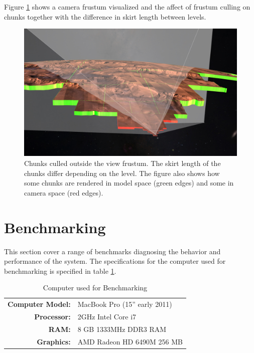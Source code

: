 Figure \ref{fig:frustummars} shows a camera frustum visualized and the affect of frustum culling on chunks together with the difference in skirt length between levels.

\begin{figure}[h]
    \centering
        \includegraphics[width=\textwidth]{figures/results/screenshots_thesis_old/frustum_mars.jpg}
    \caption{Chunks culled outside the view frustum. The skirt length of the chunks differ depending on the level. The figure also shows how some chunks are rendered in model space (green edges) and some in camera space (red edges).}
    \label{fig:frustummars}
\end{figure}

\clearpage
\section{Benchmarking}
\label{section:benchmarking}
\FloatBarrier
This section cover a range of benchmarks diagnosing the behavior and performance of the system. The specifications for the computer used for benchmarking is specified in table \ref{table:benchmark host}. 

\begin{table}[h]
  \centering
  \caption[]{Computer used for Benchmarking}
    \label{table:benchmark host}
  \begin{tabular}{| r l |}
    \hline
      \textbf{Computer Model:}  & MacBook Pro (15'' early 2011) \\
      \textbf{Processor:}       & 2GHz Intel Core i7 \\
      \textbf{RAM:}             & 8 GB 1333MHz DDR3 RAM \\
      \textbf{Graphics:}        & AMD Radeon HD 6490M 256 MB \\
    \hline
  \end{tabular}
\end{table}



